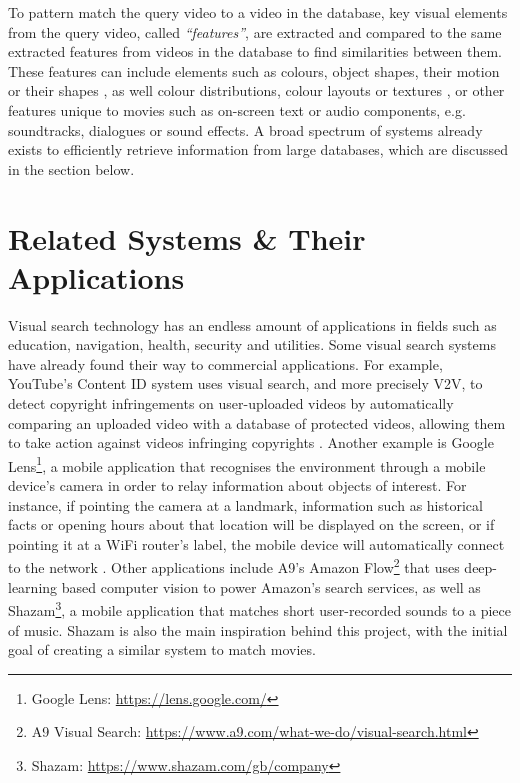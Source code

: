 

To pattern match the query video to a video in the database, key visual elements from the query video, called \textit{``features''}, are extracted and compared to the same extracted features from videos in the database to find similarities between them. These features can include elements such as colours, object shapes, their motion or their shapes \cite{patel2012}, as well colour distributions, colour layouts or textures \cite{petkovic2000}, or other features unique to movies such as on-screen text or audio components, e.g. soundtracks, dialogues or sound effects. A broad spectrum of systems already exists to efficiently retrieve information from large databases, which are discussed in the section below.


\section{Related Systems \& Their Applications}
\label{sec:v2v_applications}

Visual search technology has an endless amount of applications in fields such as education, navigation, health, security and utilities. Some visual search systems have already found their way to commercial applications. For example, YouTube's Content ID system uses visual search, and more precisely V2V, to detect copyright infringements on user-uploaded videos by automatically comparing an uploaded video with a database of protected videos, allowing them to take action against videos infringing copyrights \cite{youtube-content-id-2012}. Another example is Google Lens\footnote{Google Lens: \url{https://lens.google.com/}}, a mobile application that recognises the environment through a mobile device's camera in order to relay information about objects of interest. For instance, if pointing the camera at a landmark, information such as historical facts or opening hours about that location will be displayed on the screen, or if pointing it at a WiFi router's label, the mobile device will automatically connect to the network \cite{villaboas-google-lens2017}. Other applications include A9's Amazon Flow\footnote{A9 Visual Search: \url{https://www.a9.com/what-we-do/visual-search.html}} that uses deep-learning based computer vision to power Amazon's search services, as well as Shazam\footnote{Shazam: \url{https://www.shazam.com/gb/company}}, a mobile application that matches short user-recorded sounds to a piece of music. Shazam is also the main inspiration behind this project, with the initial goal of creating a similar system to match movies.\\

